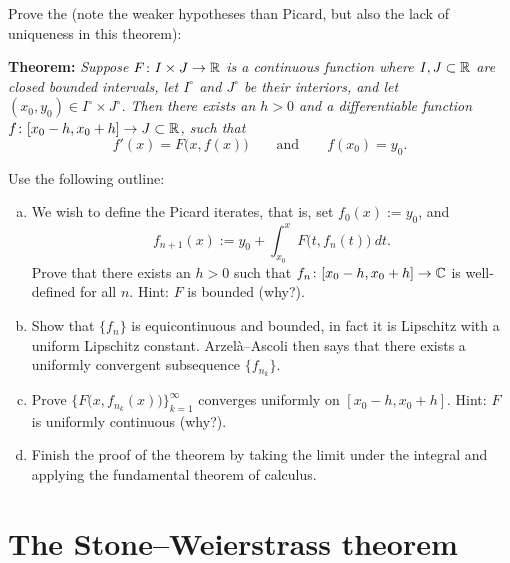 \begin{exercise} \label{exercise:peanoexistence}
Prove the \emph{} (note the weaker
hypotheses than Picard, but also the lack of
uniqueness in this theorem):

\textbf{Theorem:} \emph{Suppose $F \colon I \times J \to {\mathbb{R}}$ is 
a continuous function where
$I, J \subset {\mathbb{R}}$ are closed bounded intervals, 
let $I^\circ$ and $J^\circ$ be their interiors,
and
let $(x_0,y_0) \in I^\circ \times J^\circ$.
Then there exists an $h > 0$ and a differentiable
function $f \colon [x_0 - h, x_0 + h] \to J \subset {\mathbb{R}}$, such that}
\begin{equation*}
f'(x) = F\bigl(x,f(x)\bigr) \qquad \text{and} \qquad f(x_0) = y_0.
\end{equation*}

Use the following outline:
\begin{enumerate}[a)]
\item
We wish to define the Picard iterates, that is,
set $f_0(x) := y_0$, and 
\begin{equation*}
f_{n+1}(x) := y_0 + \int_{x_0}^x F\bigl(t,f_n(t)\bigr)~dt .
\end{equation*}
Prove that there exists an $h > 0$ such that
$f_n \colon [x_0 - h, x_0 + h] \to {\mathbb{C}}$ is well-defined
for all $n$.  Hint: $F$ is bounded (why?).
\item
Show that $\{ f_n \}$ is equicontinuous and bounded, in fact it is
Lipschitz with a uniform Lipschitz constant.  Arzel\`a--Ascoli
then says that there exists a
uniformly convergent subsequence $\{ f_{n_k} \}$.
\item
Prove 
$\bigl\{ F\bigl(x,f_{n_k}(x)\bigr) \bigr\}_{k=1}^\infty$ converges uniformly
on $[x_0-h,x_0+h]$.
Hint: $F$ is uniformly continuous (why?).
\item
Finish the proof of the theorem by taking the limit under the integral
and applying the fundamental theorem of calculus.
\end{enumerate}
\end{exercise}


\sectionnewpage
\section{The Stone--Weierstrass theorem}
\label{sec:stoneweier}


